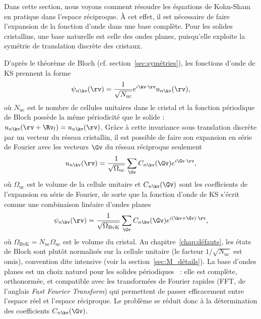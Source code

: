 Dans cette section, nous voyons comment résoudre les équations de Kohn-Sham en pratique dans l'espace réciproque. À cet effet, il est nécessaire de faire l'expansion de la fonction d'onde dans une base complète. Pour les solides cristallins, une base naturelle est celle des ondes planes, puisqu'elle exploite la symétrie de translation discrète des cristaux.


D'après le théorème de Bloch (cf. section~\ref{sec:symétries}), les fonctions d'onde de KS prennent la forme
\begin{equation}
    \psi_{n\kv}(\rv)=\frac{1}{\sqrt{N_\text{uc}}}e^{i\kv\cdot\rv}u_{n\kv}(\rv),
    \label{eqn:c2_bloch_pt2}
\end{equation}
où $N_\text{uc}$ est le nombre de cellules unitaires dans le cristal et la fonction périodique de Bloch possède la même périodicité que le solide : $u_{n\kv}(\rv+\Rv_l) = u_{n\kv}(\rv)$. Grâce à cette invariance sous translation discrète par un vecteur du réseau cristallin, il est possible de faire son expansion en série de Fourier avec les vecteurs $\Gv$ du réseau réciproque seulement
\begin{equation}
    u_{n\kv}(\rv)=\frac{1}{\sqrt{\Omega_\text{uc}}}\sum_{\Gv}C_{n\kv}(\Gv)e^{i\Gv\cdot\rv},
    \label{eqn:c2_uPW}
\end{equation}
où $\Omega_\text{uc}$ est le volume de la cellule unitaire et $C_{n\kv}(\Gv)$ sont les coefficients de l'expansion en série de Fourier, de sorte que la fonction d'onde de KS s'écrit comme une combinaison linéaire d'ondes planes
\begin{equation}
    \psi_{n\kv}(\rv)=\frac{1}{\sqrt{\Omega_\text{BvK}}}\sum_{\Gv}C_{n\kv}(\Gv)e^{i(\kv+\Gv)\cdot\rv},
    \label{eqn:c2_psiPW}
\end{equation}
où $\Omega_\text{BvK}=N_\text{uc}\Omega_\text{uc}$ est le volume du cristal. Au chapitre~\ref{chap:défauts}, les états de Bloch sont plutôt normalisés sur la cellule unitaire (le facteur $1/\sqrt{N_\text{uc}}$ est omis), convention dite intensive (voir la section~\ref{sec:M_détails}).
La base d'ondes planes est un choix naturel pour les solides périodiques~\cite{carUnifiedApproachMolecular1985,martinElectronicStructureBasic2004} : elle est complète, orthonormée, et compatible avec les transformées de Fourier rapides (FFT, de l'anglais \textit{Fast Fourier Transform}) qui permettent de passer efficacement entre l'espace réel et l'espace réciproque. Le problème se réduit donc à la détermination des coefficients $C_{n\kv}(\Gv)$.

